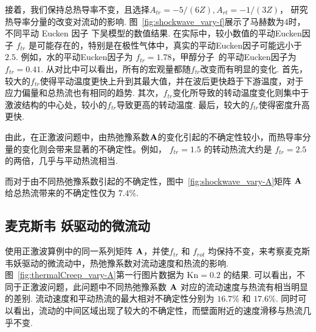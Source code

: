 接着，我们保持总热导率不变，且选择$A_{tr}=-5/(6Z), A_{rt}=-1/(3Z)$， 研究热导率分量的改变对流动的影响. 图~\ref{fig:shockwave_vary-f}展示了马赫数为4时，不同平动 Eucken 因子 下吴模型的数值结果. 在实际中，较小数值的平动Eucken因子 $f_{tr}$ 是可能存在的，特别是在极性气体中，真实的平动Eucken因子可能远小于 $ 2.5$. 例如，水的平动Eucken因子为 $f_{tr}=1.78$，甲醇分子~\cite{mason1962heat}的平动Eucken因子为 $f_{tr}=0.41$.  从对比中可以看出，所有的宏观量都随$f_{tr}$改变而有明显的变化. 首先，较大的${f_{tr}}$使得平动温度更快上升到其最大值，并在波后更快趋于下游温度，对于应力偏量和总热流也有相同的趋势. 其次，${f_{tr}}$变化所导致的转动温度变化则集中于激波结构的中心处，较小的${f_{tr}}$导致更高的转动温度. 最后，较大的${f_{tr}}$使得密度升高更快.

由此，在正激波问题中，由热弛豫系数$\bf{A}$的变化引起的不确定性较小，而热导率分量的变化则会带来显著的不确定性。例如， ${f_{tr}=1.5}$ 的转动热流大约是 ${f_{tr}=2.5}$的两倍，几乎与平动热流相当.

而对于由不同热弛豫系数引起的不确定性，图中~\ref{fig:shockwave_vary-A}矩阵 ${\bf{A}}$ 给总热流带来的不确定性仅为 ${7.4\%}$.





\subsection{麦克斯韦 妖驱动的微流动}\label{Maxwell demon}




使用正激波算例中的同一系列矩阵 ${\bf{A}}$，并使$f_{tr}$ 和 $f_{rot}$ 均保持不变，来考察麦克斯韦妖驱动的微流动中，热弛豫系数对流动速度和热流的影响. 图~\ref{fig:thermalCreep_vary-A}第一行图片数据为 $\text{Kn}=0.2$ 的结果. 可以看出，不同于正激波问题，此问题中不同热弛豫系数 ${\bf{A}}$ 对应的流动速度与热流有相当明显的差别. 流动速度和平动热流的最大相对不确定性分别为 $16.7\%$ 和 $17.6\%$. 同时可以看出，流动的中间区域出现了较大的不确定性，而壁面附近的速度滑移与热流几乎不变.


